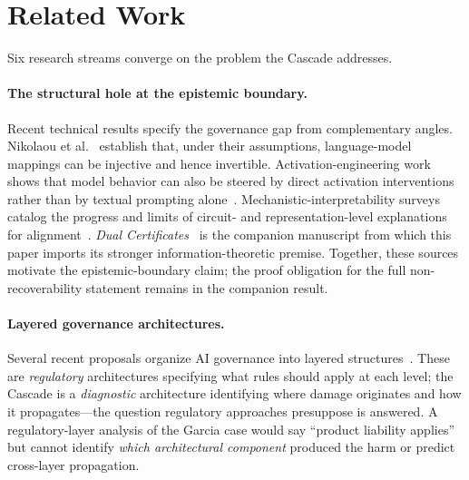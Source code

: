 \section{Related Work}\label{sec:related}

Six research streams converge on the problem the Cascade addresses.

\paragraph{The structural hole at the epistemic boundary.} Recent technical results specify the governance gap from complementary angles. Nikolaou et al.~\cite{nikolaou2025injective} establish that, under their assumptions, language-model mappings can be injective and hence invertible. Activation-engineering work shows that model behavior can also be steered by direct activation interventions rather than by textual prompting alone~\cite{turner2024steering}. Mechanistic-interpretability surveys catalog the progress and limits of circuit- and representation-level explanations for alignment~\cite{naseem2026mechanistic}. \textit{Dual Certificates}~\cite{anon2026dual} is the companion manuscript from which this paper imports its stronger information-theoretic premise. Together, these sources motivate the epistemic-boundary claim; the proof obligation for the full non-recoverability statement remains in the companion result.

\paragraph{Layered governance architectures.} Several recent proposals organize AI governance into layered structures~\cite{bommarito2025governing}. These are \textit{regulatory} architectures specifying what rules should apply at each level; the Cascade is a \textit{diagnostic} architecture identifying where damage originates and how it propagates---the question regulatory approaches presuppose is answered. A regulatory-layer analysis of the Garcia case would say ``product liability applies'' but cannot identify \textit{which architectural component} produced the harm or predict cross-layer propagation.

